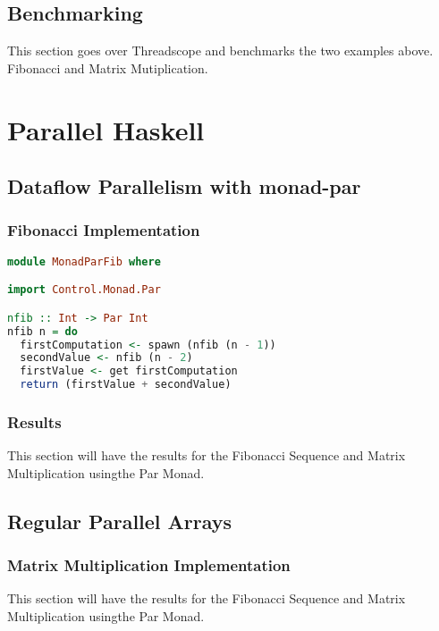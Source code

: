 \documentclass[a4paper, 10pt]{article}
\begin{document}
\subsection{Benchmarking}
This section goes over Threadscope and benchmarks the two examples above. Fibonacci and Matrix Mutiplication.

\section{Parallel Haskell}

\subsection{Dataflow Parallelism with monad-par}

\subsubsection{Fibonacci Implementation}

\begin{lstlisting}[language=Haskell, caption=Fibonnaci using monad-par library]
module MonadParFib where

import Control.Monad.Par

nfib :: Int -> Par Int
nfib n = do
  firstComputation <- spawn (nfib (n - 1))
  secondValue <- nfib (n - 2)
  firstValue <- get firstComputation
  return (firstValue + secondValue)
\end{lstlisting}

\subsubsection{Results}
This section will have the results for the Fibonacci Sequence and Matrix Multiplication usingthe Par Monad.

\subsection{Regular Parallel Arrays}

\subsubsection{Matrix Multiplication Implementation}
This section will have the results for the Fibonacci Sequence and Matrix Multiplication usingthe Par Monad.
\end{document}
